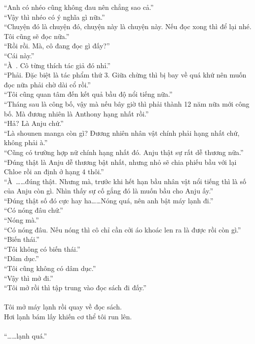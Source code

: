 \documentclass[12pt,a4paper, twosides]{book}
\begin{document}
“Anh có nhéo cũng không đau nên chẳng sao cả.”\\
“Vậy thì nhéo có ý nghĩa gì nữa.”\\
“Chuyện đó là chuyện đó, chuyện này là chuyện này. Nếu đọc xong thì để lại nhé. Tôi cũng sẽ đọc nữa.”\\
“Rồi rồi. Mà, cô đang đọc gì đấy?”\\
“Cái này.”\\
“À~. Cô từng thích tác giả đó nhỉ.”\\
“Phải. Đặc biệt là tác phẩm thứ 3. Giữa chừng thì bị bay về quá khứ nên muốn đọc nữa phải chờ dài cổ rồi.”\\
“Tôi cũng quan tâm đến kết quả bầu độ nổi tiếng nữa.”\\
“Tháng sau là công bố, vậy mà nếu bây giờ thì phải thành 12 năm nữa mới công bố. Mà đương nhiên là Anthony hạng nhất rồi.”\\
“Hả? Là Anju chứ.”\\
“Là shounen manga còn gì? Đương nhiên nhân vật chính phải hạng nhất chứ, không phải à.”\\
“Cũng có trường hợp nữ chính hạng nhất đó. Anju thật sự rất dễ thương nữa.”\\
“Đúng thật là Anju dễ thương bật nhất, nhưng nhỏ sẽ chia phiếu bầu với lại Chloe rồi an định ở hạng 4 thôi.”\\
“À~……đúng thật. Nhưng mà, trước khi hết hạn bầu nhân vật nổi tiếng thì là số của Anju còn gì. Nhìn thấy sự cố gắng đó là muốn bầu cho Anju ấy.”\\
“Đúng thật số đó cực hay ha……Nóng quá, nên anh bật máy lạnh đi.”\\
“Có nóng đâu chứ.”\\
“Nóng mà.”\\
“Có nóng đâu. Nếu nóng thì cô chỉ cần cởi áo khoác len ra là được rồi còn gì.”\\
“Biến thái.”\\
“Tôi không có biến thái.”\\
“Dâm dục.”\\
“Tôi cũng không có dâm dục.”\\
“Vậy thì mở đi.”\\
“Tôi mở rồi thì tập trung vào đọc sách đi đấy.”\\
\\
Tôi mở máy lạnh rồi quay về đọc sách.\\
Hơi lạnh bám lấy khiến cơ thể tôi run lên.\\
\\
“……lạnh quá.”\\
\end{document}
